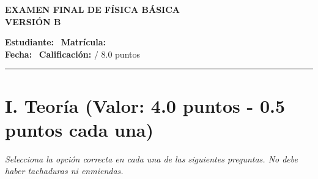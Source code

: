 \documentclass[11pt,a4paper]{article}
\begin{document}
\begin{center}
    \textbf{\Large EXAMEN FINAL DE FÍSICA BÁSICA} \\[0.2cm]
    \textbf{\large VERSIÓN B} \\[0.4cm]
\end{center}

\noindent \textbf{Estudiante:} \hrulefill \ \textbf{Matrícula:} \underline{\hspace{3cm}} \\[0.2cm]
\textbf{Fecha:} \underline{\hspace{4cm}} \ \textbf{Calificación:} \underline{\hspace{1.5cm}} / 8.0 puntos \\

\hrule
\section*{I. Teoría (Valor: 4.0 puntos - 0.5 puntos cada una)}
\textit{Selecciona la opción correcta en cada una de las siguientes preguntas. No debe haber tachaduras ni enmiendas.}
\end{document}
